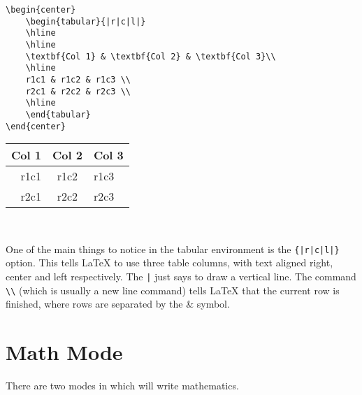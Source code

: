 \documentclass[letterpaper,twoside,10pt]{article}
\begin{document}
\begin{multicols}{2}
 {\small\begin{verbatim}
\begin{center}
    \begin{tabular}{|r|c|l|}
    \hline
    \hline
    \textbf{Col 1} & \textbf{Col 2} & \textbf{Col 3}\\
    \hline
    r1c1 & r1c2 & r1c3 \\
    r2c1 & r2c2 & r2c3 \\
    \hline
    \end{tabular}
\end{center}
        \end{verbatim}}


\begin{center}
    \begin{tabular}{|r|c|l|}
    \hline
    \hline
    \textbf{Col 1} & \textbf{Col 2} & \textbf{Col 3}\\
    \hline
    r1c1 & r1c2 & r1c3 \\
    r2c1 & r2c2 & r2c3 \\
    \hline
    \end{tabular}
\end{center}

\vspace{4pc}~
\end{multicols}

One of the main things to notice in the tabular environment is the \verb!{|r|c|l|}! option. This tells {\LaTeX} to use three table columns, with text aligned right, center and left respectively. The \verb!|! just says to draw a vertical line. The command \verb!\\! (which is usually a new line command) tells {\LaTeX} that the current row is finished, where rows are separated by the \& symbol.



















\newpage
\section{Math Mode}

There are two modes in which \LaTeXe will write mathematics.
\end{document}
